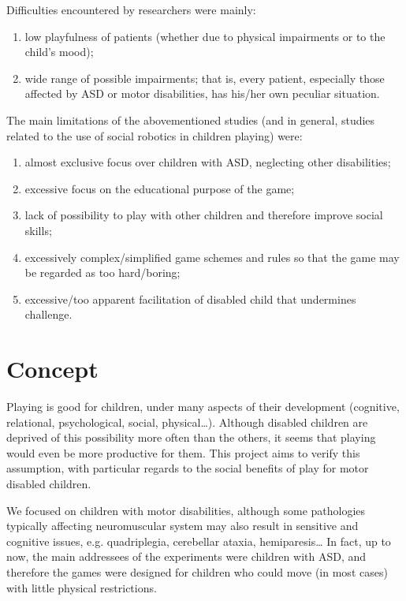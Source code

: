 \documentclass[a4paper,twoside]{book}
\begin{document}
\beforelist Difficulties encountered by researchers were mainly:
\begin{enumerate}
\item low playfulness of patients (whether due to physical impairments or to the child's mood);
\item wide range of possible impairments; that is, every patient, especially those affected by ASD or motor disabilities, has his/her own peculiar situation.
\end{enumerate}
\afterlist*

\beforelist* The main limitations of the above\textendash mentioned studies (and in general, studies related to the use of social robotics in children playing) were:
\begin{enumerate}
\item almost exclusive focus over children with ASD, neglecting other disabilities;
\item excessive focus on the educational purpose of the game;
\item lack of possibility to play with other children and therefore improve social skills;
\item excessively complex/simplified game schemes and rules so that the game may be regarded as too hard/boring;
\item excessive/too apparent facilitation of disabled child that undermines challenge.
\end{enumerate}
\afterlist*

\chapter{Concept}

Playing is good for children, under many aspects of their development (cognitive, relational, psychological, social, physical\ldots). Although disabled children are deprived of this possibility more often than the others, it seems that playing would even be more productive for them.
This project aims to verify this assumption, with particular regards to the social benefits of play for motor disabled children.

We focused on children with motor disabilities, although some pathologies typically affecting neuromuscular system may also result in sensitive and cognitive issues, e.g. quadriplegia, cerebellar ataxia, hemiparesis\ldots
In fact, up to now, the main addressees of the experiments were children with ASD, and therefore the games were designed for children who could move (in most cases) with little physical restrictions.
\end{document}
